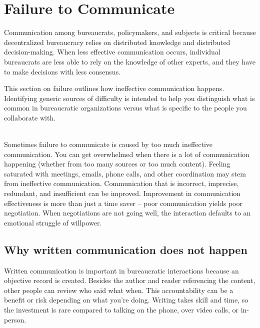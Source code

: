 \section{Failure to Communicate\label{sec:failure-to-comm}}

Communication among bureaucrats, policymakers, and subjects is critical because \gls{decentralized bureaucracy} relies on distributed knowledge and distributed decision-making. When less effective communication occurs, individual bureaucrats are less able to rely on the knowledge of other experts, and they have to make decisions with less consensus. 

This section on failure outlines how ineffective communication happens. Identifying generic sources of difficulty is intended to help you distinguish what is common in bureaucratic organizations versus what is specific to the people you collaborate with. 


\ \\

Sometimes failure to communicate is caused by too much ineffective communication. 
You can get overwhelmed when there is a lot of communication happening (whether from too many sources or too much content).
Feeling saturated with meetings, emails, phone calls, and other coordination may stem from ineffective communication. 
Communication that is incorrect, imprecise, redundant, and insufficient can be improved. 
Improvement in communication effectiveness is more than just a time saver --
poor communication yields poor negotiation. When negotiations are not going well,  the interaction defaults to an emotional struggle of willpower. 


\subsection*{Why written communication does not happen\label{sec:written-comm-does-not-happen}}

Written communication is important in bureaucratic interactions because an objective record is created. Besides the author and reader referencing the content, other people can review who said what when. This accountability can be a benefit or risk depending on what you're doing. Writing takes skill and time, so the investment is rare compared to talking on the phone, over video calls, or in-person.

